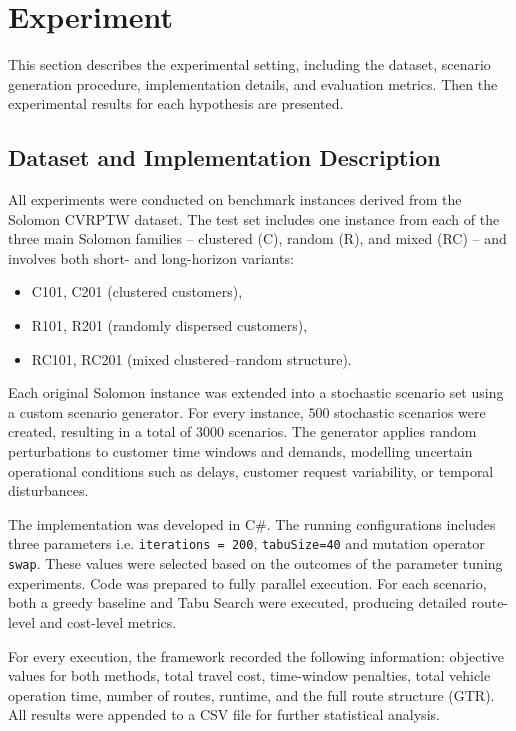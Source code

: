 \section{Experiment}
This section describes the experimental setting, including the dataset, scenario generation procedure, implementation details, and evaluation metrics. Then the experimental results for each hypothesis are presented.

\subsection{Dataset and Implementation Description}

All experiments were conducted on benchmark instances derived from the Solomon CVRPTW dataset. The test set includes one instance from each of the three main Solomon families -- clustered (C), random (R), and mixed (RC) -- and involves both short- and long-horizon variants:

\begin{itemize}
    \item C101, C201 (clustered customers),
    \item R101, R201 (randomly dispersed customers),
    \item RC101, RC201 (mixed clustered–random structure).
\end{itemize}

Each original Solomon instance was extended into a stochastic scenario set using a custom scenario generator. For every instance, $500$ stochastic scenarios were created, resulting in a total of $3000$ scenarios. The generator applies random perturbations to customer time windows and demands, modelling uncertain operational conditions such as delays, customer request variability, or temporal disturbances. 

The implementation was developed in C\#. The running configurations includes three parameters i.e.  \texttt{iterations = 200}, \texttt{tabuSize=40} and mutation operator \texttt{swap}. These values were selected based on the outcomes of the parameter tuning experiments. Code was prepared to fully parallel execution. For each scenario, both a greedy baseline and Tabu Search were executed, producing detailed route-level and cost-level metrics.

For every execution, the framework recorded the following information: objective values for both methods, total travel cost, time-window penalties, total vehicle operation time, number of routes, runtime, and the full route structure (GTR). All results were appended to a CSV file for further statistical analysis.

